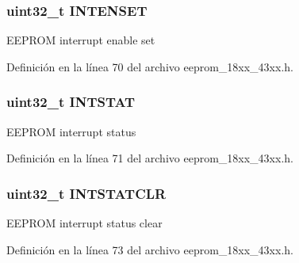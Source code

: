 \subsubsection[{\texorpdfstring{I\+N\+T\+E\+N\+S\+ET}{INTENSET}}]{ uint32\+\_\+t I\+N\+T\+E\+N\+S\+ET}\hypertarget{struct_l_p_c___e_e_p_r_o_m___t_a84ba5b4b70e1fc7e42a1a789313b4c6d}{}\label{struct_l_p_c___e_e_p_r_o_m___t_a84ba5b4b70e1fc7e42a1a789313b4c6d}
E\+E\+P\+R\+OM interrupt enable set 

Definición en la línea 70 del archivo eeprom\+\_\+18xx\+\_\+43xx.\+h.

\subsubsection[{\texorpdfstring{I\+N\+T\+S\+T\+AT}{INTSTAT}}]{ uint32\+\_\+t I\+N\+T\+S\+T\+AT}\hypertarget{struct_l_p_c___e_e_p_r_o_m___t_a0bbac120700e7e8084acf696d17068ab}{}\label{struct_l_p_c___e_e_p_r_o_m___t_a0bbac120700e7e8084acf696d17068ab}
E\+E\+P\+R\+OM interrupt status 

Definición en la línea 71 del archivo eeprom\+\_\+18xx\+\_\+43xx.\+h.

\subsubsection[{\texorpdfstring{I\+N\+T\+S\+T\+A\+T\+C\+LR}{INTSTATCLR}}]{ uint32\+\_\+t I\+N\+T\+S\+T\+A\+T\+C\+LR}\hypertarget{struct_l_p_c___e_e_p_r_o_m___t_a6923d25ab1f7294cd7a72156fe0050be}{}\label{struct_l_p_c___e_e_p_r_o_m___t_a6923d25ab1f7294cd7a72156fe0050be}
E\+E\+P\+R\+OM interrupt status clear 

Definición en la línea 73 del archivo eeprom\+\_\+18xx\+\_\+43xx.\+h.

